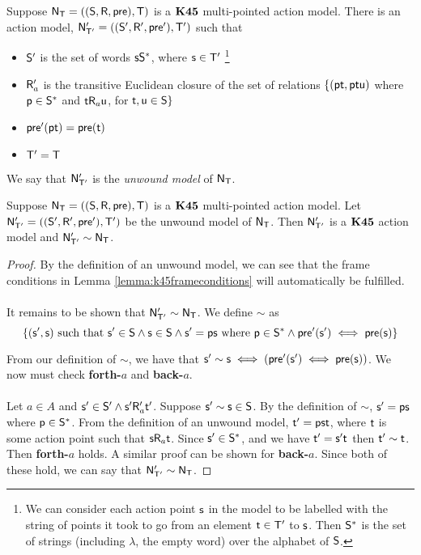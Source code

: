 \begin{defn}\label{def:unwoundModel}
  Suppose $\evM_\evT = ((\evS,\evR,\evpr),\evT)$ is a $\AXKFF$ multi-pointed
  action model.
  There is an action model, $\evM'_{\evT'} = ((\evS',\evR',\evpr'),\evT')$ such that
  \begin{itemize}
		\item $\evS'$ is the set of words $\evs \evS^\ast$, where $\evs \in \evT'$
			\footnote{We can consider each action point $\evs$ in the model to be labelled with the string of
			points it took to go from an element $\evt \in \evT'$ to $\evs$.
			Then $\evS^\ast$ is the set of strings (including $\lambda$, the empty word) over the alphabet 
			of $\evS$.}
		\item $\evR'_a$ is the transitive Euclidean closure of the set of relations $\{(\evp \evt,
			\evp \evt \evu)$ where $\evp \in \evS^\ast$ and $\evt \evR_a \evu$, for $\evt, \evu \in \evS \}$
		\item $\evpr'(\evp \evt) = \evpr(\evt)$
		\item $\evT' = \evT$
  \end{itemize}
  We say that $\evM'_{\evT'}$ is the {\em unwound model} of $\evM_\evT$.
\end{defn}

\begin{lemma} \label{lemma:unwoundModel:bisimilar}
  Suppose $\evM_\evT = ((\evS,\evR,\evpr),\evT)$ is a $\AXKFF$ multi-pointed
  action model.
	Let $\evM'_{\evT'} = ((\evS',\evR',\evpr'),\evT')$ be the unwound model of $\evM_\evT$.
	Then $\evM'_{\evT'}$ is a $\AXKFF$ action model and $\evM'_{\evT'} \sim \evM_\evT$.
\end{lemma}
\begin{proof}
	By the definition of an unwound model, we can see that the frame conditions in Lemma 
	\ref{lemma:k45frameconditions} will automatically be fulfilled.\\
	\\
	It remains to be shown that $\evM'_{\evT'} \sim \evM_\evT$.
	We define $\sim$ as
	\[
		\{(\evs',\evs) \text{ such that } \evs' \in \evS \land \evs \in \evS \land \evs' = \evp \evs
			\text{ where } \evp \in \evS^\ast \land \evpr'(\evs') \iff \evpr(\evs) \}
	\]

	From our definition of $\sim$, we have that $\evs' \sim \evs \iff (\evpr'(\evs') \iff
	\evpr(\evs))$.
	We now must check {\bf forth-$a$} and {\bf back-$a$}.\\
	\\
	Let $a \in A$ and $\evs' \in \evS' \land \evs' \evR'_a \evt'$.
	Suppose $\evs' \sim \evs \in \evS$.
	By the definition of $\sim$, $\evs' = \evp \evs$ where $\evp \in \evS^\ast$.
	From the definition of an unwound model, $\evt' = \evp \evs \evt$, where $\evt$ is some action
	point such that $\evs \evR_a \evt$.
	Since $\evs' \in \evS^\ast$, and we have $\evt' = \evs' \evt$ then $\evt' \sim \evt$.
	Then {\bf forth-$a$} holds.
	A similar proof can be shown for {\bf back-$a$}.
	Since both of these hold, we can say that $\evM'_{\evT'} \sim \evM_\evT$.
\end{proof}

